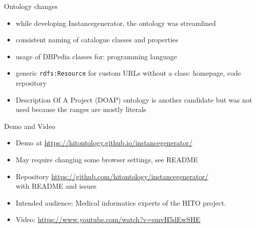\documentclass[aspectratio=1610]{beamer}
\begin{document}
\begin{frame}{Ontology changes}
\begin{itemize}
\item while developing Instancegenerator, the ontology was streamlined
\item consistent naming of catalogue classes and properties
\item usage of DBPedia classes for: programming language 
\item generic \texttt{rdfs:Resource} for custom URLs without a class: homepage, code repository
\item Description Of A Project (DOAP) ontology is another candidate but was not used because the ranges are mostly literals 
\end{itemize}
\end{frame}

\begin{frame}{Demo and Video}
\begin{itemize}
\item Demo at \url{https://hitontology.github.io/instancegenerator/}
\item May require changing some browser settings, see README
\item Repository \url{https://github.com/hitontology/instancegenerator/}\\with README and issues
\item Intended audience: Medical informatics experts of the HITO project.
\item Video: \url{https://www.youtube.com/watch?v=smvH5dEwSHE}
\end{itemize}
\end{frame}
\end{document}
